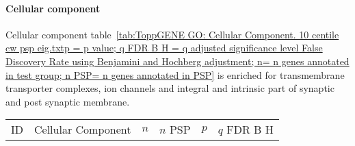\paragraph{Cellular component}

Cellular component table~\ref{tab:ToppGENE GO: Cellular Component. 10 centile cw psp eig.txtp = p value; q FDR B H = q adjusted significance level False Discovery Rate using Benjamini and Hochberg adjustment; n= n genes annotated in test group; n PSP= n genes annotated in PSP} is enriched for transmembrane transporter complexes, ion channels and integral and intrinsic part of synaptic and post synaptic membrane. 
 \begin{table}[ht]
\centering
\begin{adjustbox}{width=\textwidth}
\setlength{\extrarowheight}{2pt}
\begin{tabular}{@{}clllcl@{}}
  \toprule
  ID & Cellular Component & $n$ & $n$ PSP & $p$ & $q$ FDR B H \\ 


\end{tabular}
\end{adjustbox}
\end{table}
